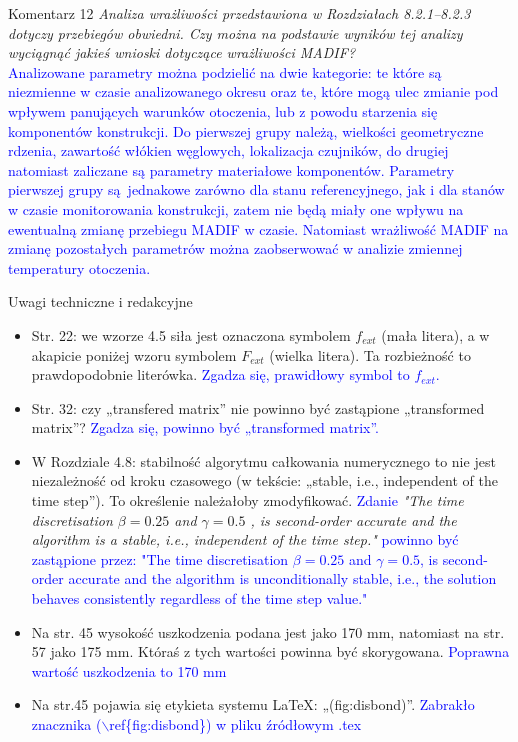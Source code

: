 \documentclass[10pt,aspectratio=169]{beamer} %
\begin{document}
\begin{frame}[label=frame18]{Komentarz 12}\justifying
\textit{Analiza wrażliwości przedstawiona w Rozdziałach 8.2.1–8.2.3 dotyczy przebiegów obwiedni. Czy można na podstawie wyników tej analizy wyciągnąć jakieś wnioski dotyczące wrażliwości MADIF?}\\
\textcolor{blue}{Analizowane parametry można podzielić na dwie kategorie: te które są niezmienne w czasie analizowanego okresu oraz te, które mogą ulec zmianie pod wpływem panujących warunków otoczenia, lub z powodu starzenia się komponentów konstrukcji. Do pierwszej grupy należą, wielkości geometryczne rdzenia, zawartość włókien węglowych, lokalizacja czujników, do drugiej natomiast zaliczane są parametry materiałowe komponentów. Parametry pierwszej grupy są~jednakowe zarówno dla stanu referencyjnego, jak i dla stanów w czasie monitorowania konstrukcji, zatem nie będą miały one wpływu na ewentualną zmianę przebiegu MADIF w czasie. Natomiast wrażliwość MADIF na zmianę pozostałych parametrów można zaobserwować w analizie zmiennej temperatury otoczenia.}
\end{frame}
\begin{frame}[label=frame18]{Uwagi techniczne i redakcyjne}\justifying
	\begin{itemize}
		\item Str. 22: we wzorze 4.5 siła jest oznaczona symbolem \(f_{ext}\) (mała litera), a w akapicie poniżej wzoru symbolem \(F_{ext}\) (wielka litera). Ta rozbieżność to prawdopodobnie literówka. \textcolor{blue}{Zgadza się, prawidłowy symbol to \(f_{ext}\).}
		\item Str. 32: czy „transfered matrix” nie powinno być zastąpione „transformed matrix”? \textcolor{blue}{Zgadza się, powinno być „transformed matrix”.}
		\item W Rozdziale 4.8: stabilność algorytmu całkowania numerycznego to nie jest niezależność od kroku czasowego (w tekście: „stable, i.e., independent of the time step”). To określenie należałoby zmodyfikować. \textcolor{blue}{Zdanie} \textit{"The time discretisation \(\beta = 0.25\) and \(\gamma = 0.5\) , is second-order accurate and the algorithm is a stable, i.e., independent of the time step."} \textcolor{blue}{powinno być zastąpione przez: "The time discretisation \(\beta = 0.25\) and \(\gamma = 0.5\), is second-order accurate and the algorithm is unconditionally stable, i.e., the solution behaves consistently regardless of the time step value."}
		\item  \small{Na str. 45 wysokość uszkodzenia podana jest jako 170 mm, natomiast na str. 57 jako 175 mm. Któraś z tych wartości powinna być skorygowana. \textcolor{blue}{Poprawna wartość uszkodzenia to 170 mm}}
		\item \small{Na str.45 pojawia się etykieta systemu LaTeX: „(fig:disbond)”. \textcolor{blue}{Zabrakło znacznika (\(\backslash\)ref\{fig:disbond\}) w pliku źródłowym .tex}}
	\end{itemize}
	
\end{frame}	
\end{document}
